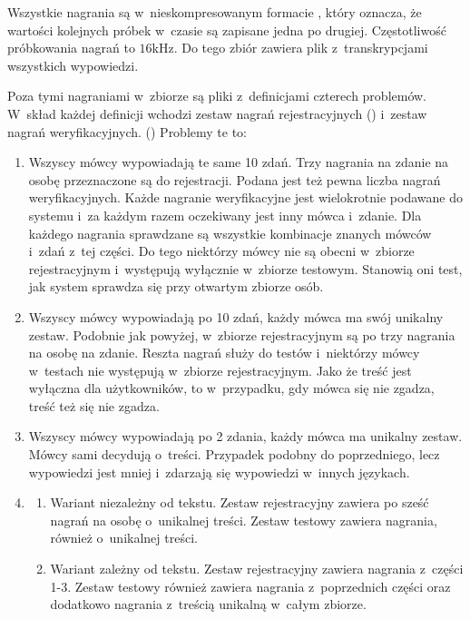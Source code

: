 Wszystkie nagrania są w~nieskompresowanym formacie , który oznacza, że wartości kolejnych próbek w~czasie
są zapisane jedna po drugiej. Częstotliwość próbkowania nagrań to $16$kHz. Do tego zbiór zawiera plik z~transkrypcjami
wszystkich wypowiedzi.

Poza tymi nagraniami w~zbiorze są pliki z~definicjami czterech problemów. W~skład każdej definicji wchodzi zestaw nagrań
rejestracyjnych () i~zestaw nagrań weryfikacyjnych. () Problemy te to:
\begin{enumerate}
    \item Wszyscy mówcy wypowiadają te same 10 zdań. Trzy nagrania na zdanie na osobę przeznaczone są do rejestracji. Podana
        jest też pewna liczba nagrań weryfikacyjnych. Każde nagranie weryfikacyjne jest wielokrotnie podawane do systemu
        i~za każdym razem oczekiwany jest inny mówca i~zdanie. Dla każdego nagrania sprawdzane są wszystkie
        kombinacje znanych mówców i~zdań z~tej części. Do tego niektórzy
        mówcy nie są obecni w~zbiorze rejestracyjnym i~występują wyłącznie w~zbiorze testowym. Stanowią oni test, jak system
        sprawdza się przy otwartym zbiorze osób.
    \item Wszyscy mówcy wypowiadają po 10 zdań, każdy mówca ma swój unikalny zestaw. Podobnie jak powyżej, w~zbiorze
        rejestracyjnym są po trzy nagrania na osobę na zdanie. Reszta nagrań służy do testów i~niektórzy
        mówcy w~testach nie występują w~zbiorze rejestracyjnym.
        Jako że treść jest wyłączna dla użytkowników, to w~przypadku, gdy mówca się nie zgadza, treść też się nie zgadza.
    \item Wszyscy mówcy wypowiadają po 2 zdania, każdy mówca ma unikalny zestaw. Mówcy sami decydują o~treści.
        Przypadek podobny do poprzedniego, lecz wypowiedzi jest mniej i~zdarzają się wypowiedzi w~innych językach.
    \item
        \begin{enumerate}
            \item Wariant niezależny od tekstu. Zestaw rejestracyjny zawiera po sześć nagrań na osobę o~unikalnej treści.
                Zestaw testowy zawiera nagrania, również o~unikalnej treści.
            \item Wariant zależny od tekstu. Zestaw rejestracyjny zawiera nagrania z~części 1-3. Zestaw testowy również
                zawiera nagrania z~poprzednich części oraz dodatkowo nagrania z~treścią unikalną w~całym zbiorze.
        \end{enumerate}
\end{enumerate}

